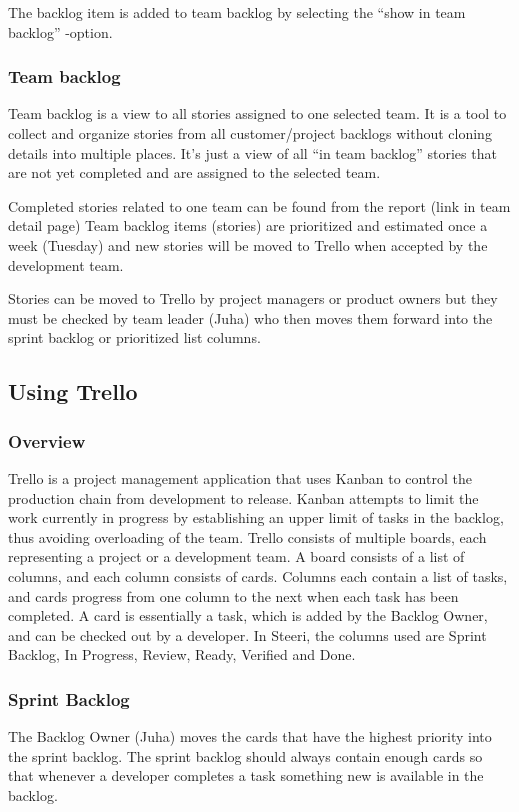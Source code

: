 \documentclass[english]{tktltiki2}
\theoremstyle{definition}
\theoremstyle{remark}
\begin{document}
The backlog item is added to team backlog by selecting the “show in team backlog” -option.

\subsubsection{Team backlog}
Team backlog is a view to all stories assigned to one selected team. It is a tool to collect and organize stories from all customer/project backlogs without cloning details into multiple places. It’s just a view of all “in team backlog” stories that are not yet completed and are assigned to the selected team.

Completed stories related to one team can be found from the report (link in team detail page)
Team backlog items (stories) are prioritized and estimated once a week (Tuesday) and new stories will be moved to Trello when accepted by the development team.

Stories can be moved to Trello by project managers or product owners but they must be checked by team leader (Juha) who then moves them forward into the sprint backlog or prioritized list columns.

\subsection{Using Trello}

\subsubsection{Overview}
Trello is a project management application that uses Kanban to control the production chain from development to release. Kanban attempts to limit the work currently in progress by establishing an upper limit of tasks in the backlog, thus avoiding overloading of the team. Trello consists of multiple boards, each representing a project or a development team. A board consists of a list of columns, and each column consists of cards. Columns each contain a list of tasks, and cards progress from one column to the next when each task has been completed. A card is essentially a task, which is added by the Backlog Owner, and can be checked out by a developer. In Steeri, the columns used are Sprint Backlog, In Progress, Review, Ready, Verified and Done. 

\subsubsection{Sprint Backlog}
The Backlog Owner (Juha) moves the cards that have the highest priority into the sprint backlog. The sprint backlog should always contain enough cards so that whenever a developer completes a task something new is available in the backlog.
\end{document}
